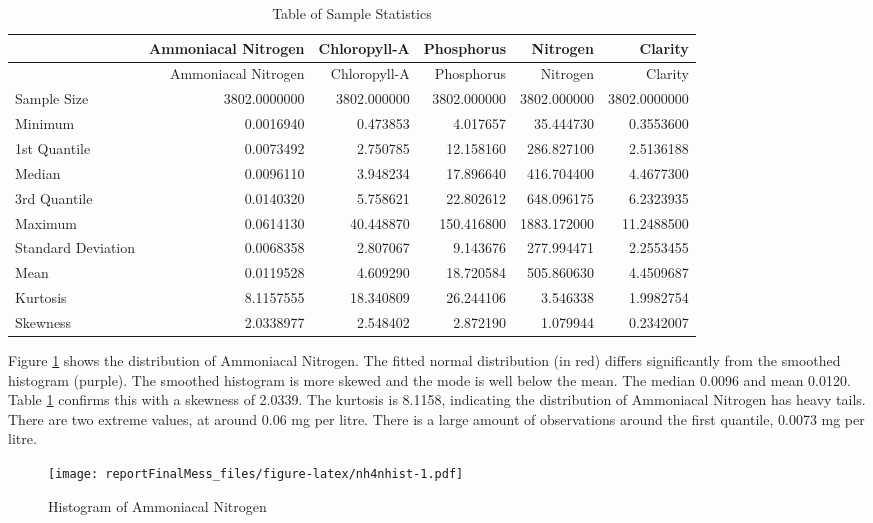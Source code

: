 \documentclass[
]{article}
\begin{document}
\begin{longtable}[]{@{}lrrrrr@{}}
\caption{\label{tab:laketable}Table of Sample Statistics}\tabularnewline
\toprule()
& Ammoniacal Nitrogen & Chloropyll-A & Phosphorus & Nitrogen & Clarity \\
\midrule()
\endfirsthead
\toprule()
& Ammoniacal Nitrogen & Chloropyll-A & Phosphorus & Nitrogen & Clarity \\
\midrule()
\endhead
Sample Size & 3802.0000000 & 3802.000000 & 3802.000000 & 3802.000000 & 3802.0000000 \\
Minimum & 0.0016940 & 0.473853 & 4.017657 & 35.444730 & 0.3553600 \\
1st Quantile & 0.0073492 & 2.750785 & 12.158160 & 286.827100 & 2.5136188 \\
Median & 0.0096110 & 3.948234 & 17.896640 & 416.704400 & 4.4677300 \\
3rd Quantile & 0.0140320 & 5.758621 & 22.802612 & 648.096175 & 6.2323935 \\
Maximum & 0.0614130 & 40.448870 & 150.416800 & 1883.172000 & 11.2488500 \\
Standard Deviation & 0.0068358 & 2.807067 & 9.143676 & 277.994471 & 2.2553455 \\
Mean & 0.0119528 & 4.609290 & 18.720584 & 505.860630 & 4.4509687 \\
Kurtosis & 8.1157555 & 18.340809 & 26.244106 & 3.546338 & 1.9982754 \\
Skewness & 2.0338977 & 2.548402 & 2.872190 & 1.079944 & 0.2342007 \\
\bottomrule()
\end{longtable}

Figure \ref{fig:nh4nhist} shows the distribution of Ammoniacal Nitrogen. The fitted normal distribution (in red) differs significantly from the smoothed histogram (purple). The smoothed histogram is more skewed and the mode is well below the mean. The median 0.0096 and mean 0.0120. Table \ref{tab:laketable} confirms this with a skewness of 2.0339. The kurtosis is 8.1158, indicating the distribution of Ammoniacal Nitrogen has heavy tails. There are two extreme values, at around 0.06 mg per litre. There is a large amount of observations around the first quantile, 0.0073 mg per litre.

\begin{figure}
\centering
\texttt{[image: reportFinalMess\_files/figure-latex/nh4nhist-1.pdf]}
\caption{\label{fig:nh4nhist}Histogram of Ammoniacal Nitrogen}
\end{figure}
\end{document}
